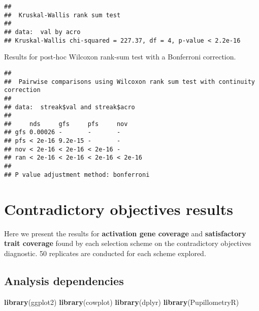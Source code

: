 \documentclass[]{book}
\newenvironment{Shaded}{\begin{snugshade}}{\end{snugshade}}
\newcommand{\DataTypeTok}[1]{\textcolor[rgb]{0.13,0.29,0.53}{#1}}
\newcommand{\KeywordTok}[1]{\textcolor[rgb]{0.13,0.29,0.53}{\textbf{#1}}}
\newcommand{\NormalTok}[1]{#1}
\newcommand{\OperatorTok}[1]{\textcolor[rgb]{0.81,0.36,0.00}{\textbf{#1}}}
\newcommand{\OtherTok}[1]{\textcolor[rgb]{0.56,0.35,0.01}{#1}}
\newcommand{\StringTok}[1]{\textcolor[rgb]{0.31,0.60,0.02}{#1}}
\begin{document}
\begin{verbatim}
## 
##  Kruskal-Wallis rank sum test
## 
## data:  val by acro
## Kruskal-Wallis chi-squared = 227.37, df = 4, p-value < 2.2e-16
\end{verbatim}

Results for post-hoc Wilcoxon rank-sum test with a Bonferroni correction.

\begin{Shaded}
\end{Shaded}

\begin{verbatim}
## 
##  Pairwise comparisons using Wilcoxon rank sum test with continuity correction 
## 
## data:  streak$val and streak$acro 
## 
##     nds     gfs     pfs     nov    
## gfs 0.00026 -       -       -      
## pfs < 2e-16 9.2e-15 -       -      
## nov < 2e-16 < 2e-16 < 2e-16 -      
## ran < 2e-16 < 2e-16 < 2e-16 < 2e-16
## 
## P value adjustment method: bonferroni
\end{verbatim}

\hypertarget{contradictory-objectives-results}{%
\chapter{Contradictory objectives results}\label{contradictory-objectives-results}}

Here we present the results for \textbf{activation gene coverage} and \textbf{satisfactory trait coverage} found by each selection scheme on the contradictory objectives diagnostic.
50 replicates are conducted for each scheme explored.

\hypertarget{analysis-dependencies-2}{%
\section{Analysis dependencies}\label{analysis-dependencies-2}}

\begin{Shaded}
\begin{Highlighting}[]
\KeywordTok{library}\NormalTok{(ggplot2)}
\KeywordTok{library}\NormalTok{(cowplot)}
\KeywordTok{library}\NormalTok{(dplyr)}
\KeywordTok{library}\NormalTok{(PupillometryR)}
\end{Highlighting}
\end{Shaded}
\end{document}
